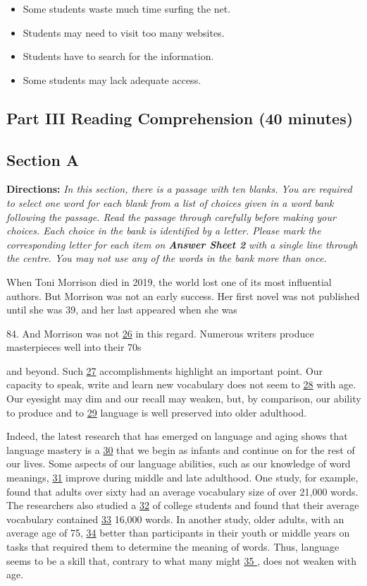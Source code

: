 \documentclass[UTF8,11pt]{ctexart}
\begin{document}
\begin{itemize}[leftmargin=2em,itemsep=.2em,topsep=.4em]\item[A.] Some students waste much time surfing the net.
\item[B.] Students may need to visit too many websites.
\item[C.] Students have to search for the information.
\item[D.] Some students may lack adequate access.
\end{itemize}

\subsection*{\textbf{Part III Reading Comprehension (40 minutes)}}


\subsection*{\textbf{Section A}}


\textbf{Directions:} \textit{In this section, there is a passage with ten blanks. You are required to select one word for each blank} \textit{from a list of choices given in a word bank following the passage. Read the passage through carefully before} \textit{making your choices. Each choice in the bank is identified by a letter. Please mark the corresponding letter for} \textit{each item on }\textbf{\textit{Answer Sheet 2}}\textit{ with a single line through the centre. You may not use any of the words in the bank} \textit{more than once.}


When Toni Morrison died in 2019, the world lost one of its most influential authors. But Morrison was not an early success. Her first novel was not published until she was 39, and her last appeared when she was


84. And Morrison was not \uline{26} in this regard. Numerous writers produce masterpieces well into their 70s


and beyond. Such \uline{27} accomplishments highlight an important point. Our capacity to speak, write and learn new vocabulary does not seem to \uline{28} with age. Our eyesight may dim and our recall may weaken, but, by comparison, our ability to produce and to \uline{29} language is well preserved into older adulthood.


Indeed, the latest research that has emerged on language and aging shows that language mastery is a \uline{30} that we begin as infants and continue on for the rest of our lives. Some aspects of our language abilities, such as our knowledge of word meanings, \uline{31} improve during middle and late adulthood. One study, for example, found that adults over sixty had an average vocabulary size of over 21,000 words. The researchers also studied a \uline{32} of college students and found that their average vocabulary contained \uline{33} 16,000 words. In another study, older adults, with an average age of 75, \uline{34} better than participants in their youth or middle years on tasks that required them to determine the meaning of words. Thus, language seems to be a skill that, contrary to what many might \uline{35 }, does not weaken with age.
\end{document}
